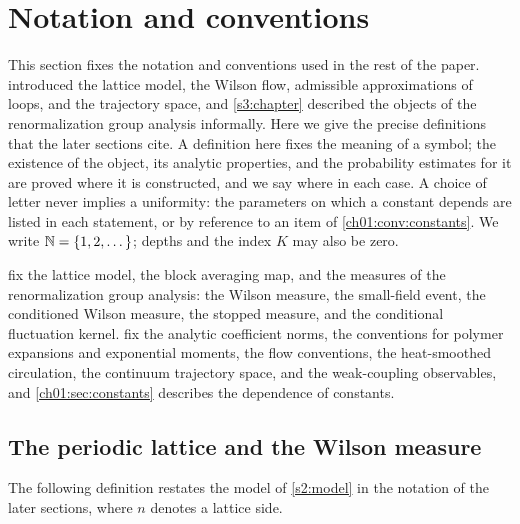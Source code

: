 \chapter{Notation and conventions}\label{ch01:chapter}

This section fixes the notation and conventions used in the rest of the paper.  introduced the lattice model, the Wilson flow, admissible approximations of loops, and the trajectory space, and \cref{s3:chapter} described the objects of the renormalization group analysis informally. Here we give the precise definitions that the later sections cite. A definition here fixes the meaning of a symbol; the existence of the object, its analytic properties, and the probability estimates for it are proved where it is constructed, and we say where in each case. A choice of letter never implies a uniformity: the parameters on which a constant depends are listed in each statement, or by reference to an item of \cref{ch01:conv:constants}. We write $\mathbb N=\{1,2,\dots\}$; depths and the index $K$ may also be zero.

 fix the lattice model, the block averaging map, and the measures of the renormalization group analysis: the Wilson measure, the small-field event, the conditioned Wilson measure, the stopped measure, and the conditional fluctuation kernel.  fix the analytic coefficient norms, the conventions for polymer expansions and exponential moments, the flow conventions, the heat-smoothed circulation, the continuum trajectory space, and the weak-coupling observables, and \cref{ch01:sec:constants} describes the dependence of constants.

\section{The periodic lattice and the Wilson measure}\label{ch01:sec:model}

The following definition restates the model of \cref{s2:model} in the notation of the later sections, where $n$ denotes a lattice side.

